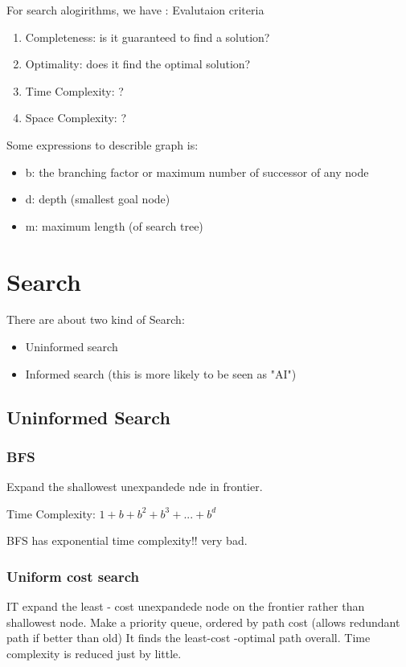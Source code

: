 \documentclass[12pt]{article}
\begin{document}
For search alogirithms, we have :
\huge{Evalutaion criteria}
\begin{enumerate}
  \item Completeness: is it guaranteed to find a solution?
  \item Optimality: does it find the optimal solution?
  \item Time Complexity: ?
  \item Space Complexity: ?
\end{enumerate}
Some expressions to describle graph is:
\begin{itemize}
  \item b: the branching factor or maximum number of successor of any node
  \item d: depth (smallest goal node)
  \item m: maximum length (of search tree)
\end{itemize}
\section{Search}

There are about two kind of Search:
\begin{itemize}
  \item Uninformed search
  \item Informed search (this is more likely to be seen as "AI")
\end{itemize}

\subsection{Uninformed Search}
\subsubsection{BFS}
Expand the shallowest unexpandede nde in frontier.

Time Complexity: $1+b+b^2+b^3+...+b^{d}$

BFS has exponential time complexity!! very bad.

\subsubsection{Uniform cost search}



IT expand the least - cost unexpandede node on the frontier rather than shallowest node.
Make a priority queue, ordered by path cost (allows redundant path if better than old)
It finds the least-cost -optimal path overall.
Time complexity is reduced just by little.
\end{document}
